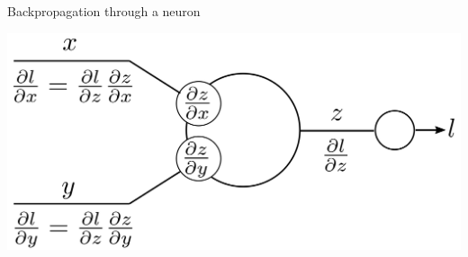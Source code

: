 \documentclass[xcolor=pdftex,dvipsnames,table,mathserif]{beamer}
\begin{document}
\begin{frame}{Backpropagation through a neuron}

  \includegraphics[width=\textwidth]{bp_2_1_neuron.png}

\end{frame}
\end{document}
